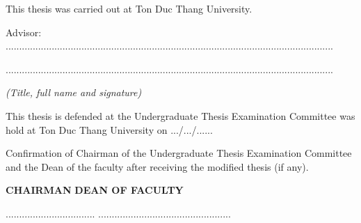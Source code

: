 \newpage

\begin{flushleft}
	This thesis was carried out at Ton Duc Thang University.
	
	Advisor:
	\hspace{0.5cm}.........................................................................................................................
	
	\hspace{2.2cm}.........................................................................................................................
	
	\hspace{3.5cm} \textit{(Title, full name and signature)}
	
	\vspace{0.5cm}
	This thesis is defended at the Undergraduate Thesis Examination Committee was hold at Ton Duc Thang University on .../.../......
	
	\vspace{0.5cm}
	Confirmation of Chairman of the Undergraduate Thesis Examination Committee and the Dean of the faculty after receiving the modified thesis (if any).

\end{flushleft}

\vspace{0.5cm}
\hspace{0.5CM} \textbf{CHAIRMAN} 
\hspace{4.5cm} \textbf{DEAN OF FACULTY}

\vspace{2cm}
\hspace{0.2cm}.................................
\hspace{3.5cm}.................................................



\newpage

